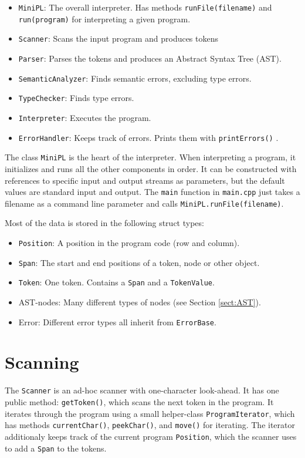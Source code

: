 \documentclass[a4paper]{article}
\newcommand*{\code}[1]{\texttt{#1}}
\begin{document}
\begin{itemize}
  \item \code{MiniPL}: The overall interpreter. Has methods 
        \code{runFile(filename)} and \code{run(program)} for 
        interpreting a given program.
  \item \code{Scanner}:  
        Scans the input program and produces tokens
  \item \code{Parser}:
        Parses the tokens and produces an Abstract Syntax Tree (AST).
  \item \code{SemanticAnalyzer}: Finds semantic
        errors, excluding type errors.
  \item \code{TypeChecker}: Finds type errors.
  \item \code{Interpreter}: Executes the program.
  \item \code{ErrorHandler}: Keeps track of errors. Prints them with
  \code{printErrors()} .
\end{itemize}
The class \code{MiniPL} is the heart of the interpreter. When 
interpreting a program, it initializes 
and runs all the other components in order. It can be constructed 
with references to specific input and output streams as parameters, 
but the default values are standard input and output. 
The \code{main} function in \code{main.cpp} just takes a 
filename as a command line parameter and calls 
\code{MiniPL.runFile(filename)}. 

Most of the data is stored in the following struct types:
\begin{itemize}
  \item \code{Position}: A position in the program code (row and column).
  \item \code{Span}: The start and end positions of a token, node or other object.
  \item \code{Token}: One token. Contains a \code{Span} and 
  a \code{TokenValue}.
  \item AST-nodes: Many different types of nodes 
        (see Section \ref{sect:AST}).
  \item Error: Different 
  error types all inherit from \code{ErrorBase}.
\end{itemize}



\clearpage
\section{Scanning}

The \code{Scanner} is an ad-hoc scanner with one-character look-ahead.
It has one public method: \code{getToken()}, which scans the next token 
in the program.
It iterates through the program using a small helper-class 
\code{ProgramIterator}, which has methods \code{currentChar()}, 
\code{peekChar()}, and \code{move()} for iterating. The 
iterator additionaly keeps track of the current program \code{Position}, 
which the scanner uses to add a \code{Span} to the tokens.
\end{document}
